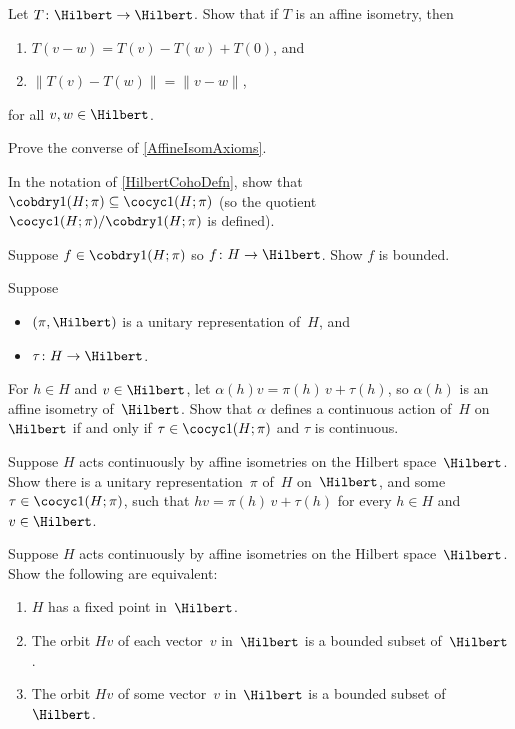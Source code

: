 \begin{exercises}

\item \label{AffineIsomAxioms}
Let $T \colon \Hilbert \to \Hilbert$. Show that if $T$ is an affine isometry, then
 \begin{enumerate}
 \item $T(v - w) = T(v) - T(w) + T(0)$,
 and
 \item $\|T(v)-T(w)\| = \|v-w\|$,
 \end{enumerate}
 for all $v,w \in \Hilbert$. 

\item \label{AffIsom<>}
Prove the converse of \cref{AffineIsomAxioms}.

\item \label{B1inZ1}
 In the notation of \cref{HilbertCohoDefn}, show that
$\cobdry1(H;\pi) \subseteq \cocyc1(H;\pi)$ (so the quotient $\cocyc1(H; \pi) / \cobdry1(H; \pi)$ is defined).

\item \label{CobdryIsBdd}
Suppose $f \in \cobdry1(H;\pi)$ so $f \colon H \to \Hilbert$. Show $f$ is bounded.

\item \label{Z1<>act}
Suppose 
	\begin{itemize}
	\item $(\pi,\Hilbert)$ is a unitary representation of~$H$,
	and
	\item $\tau \colon H \to \Hilbert$.
	\end{itemize}
For $h \in H$ and $v \in \Hilbert$, let $\alpha(h)v = \pi(h)\, v + \tau(h)$, so $\alpha(h)$ is an affine isometry of~$\Hilbert$. Show that $\alpha$ defines a continuous action of~$H$ on~$\Hilbert$ if and only if $\tau \in \cocyc1(H;\pi)$ and $\tau$ is continuous.

\item \label{AffineMustFromRep}
Suppose $H$ acts continuously by affine isometries on the Hilbert space~$\Hilbert$. Show there is a unitary representation~$\pi$ of~$H$ on~$\Hilbert$, and some $\tau \in \cocyc1(H;\pi)$, such that $hv =  \pi(h)\, v + \tau(h)$ for every $h \in H$ and $v \in \Hilbert$. 

 \item \label{FP<>SomeOrbitBdd<>EveryOrbitBddEx}
  Suppose $H$ acts continuously by affine isometries
on the Hilbert space~$\Hilbert$. Show the following are equivalent:
	\begin{enumerate}
	\item $H$ has a fixed point in~$\Hilbert$.
	\item The orbit $Hv$ of each vector~$v$ in~$\Hilbert$ is a bounded subset of~$\Hilbert$.
	\item The orbit $Hv$ of some vector~$v$ in~$\Hilbert$ is a bounded subset of~$\Hilbert$.
	\end{enumerate}


\end{exercises}
